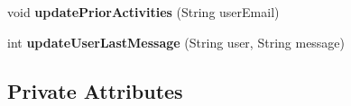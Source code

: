 \begin{DoxyCompactItemize}
\item 
void {\bfseries update\+Prior\+Activities} (String user\+Email)\hypertarget{classcom_1_1example_1_1sebastian_1_1tindertp_1_1ChatListActivity_ac1ce468e552feb9897eb2817cc6453d5}{}\label{classcom_1_1example_1_1sebastian_1_1tindertp_1_1ChatListActivity_ac1ce468e552feb9897eb2817cc6453d5}

\item 
int {\bfseries update\+User\+Last\+Message} (String user, String message)\hypertarget{classcom_1_1example_1_1sebastian_1_1tindertp_1_1ChatListActivity_a3a1d062b50894d133786279e11933418}{}\label{classcom_1_1example_1_1sebastian_1_1tindertp_1_1ChatListActivity_a3a1d062b50894d133786279e11933418}

\end{DoxyCompactItemize}
\subsection*{Private Attributes}
